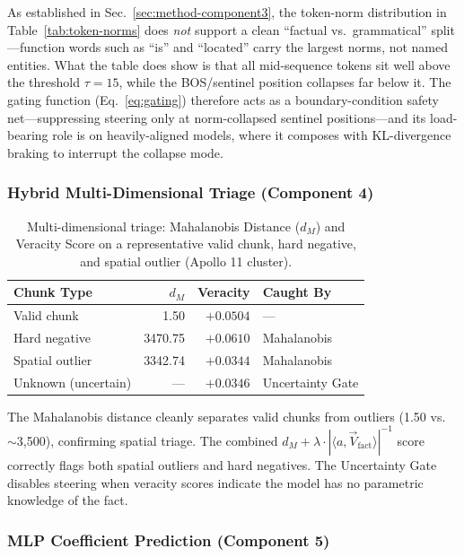 \documentclass[conference]{IEEEtran}
\begin{document}
As established in Sec.~\ref{sec:method-component3}, the token-norm distribution in Table~\ref{tab:token-norms} does \emph{not} support a clean ``factual vs.\ grammatical'' split---function words such as ``is'' and ``located'' carry the largest norms, not named entities. What the table does show is that all mid-sequence tokens sit well above the threshold $\tau\!=\!15$, while the BOS/sentinel position collapses far below it. The gating function (Eq.~\ref{eq:gating}) therefore acts as a boundary-condition safety net---suppressing steering only at norm-collapsed sentinel positions---and its load-bearing role is on heavily-aligned models, where it composes with KL-divergence braking to interrupt the collapse mode.

\subsubsection{Hybrid Multi-Dimensional Triage (Component 4)}

\begin{table}[htbp]
\caption{Multi-dimensional triage: Mahalanobis Distance ($d_M$) and Veracity Score on a representative valid chunk, hard negative, and spatial outlier (Apollo 11 cluster).}
\centering
\begin{tabular}{lrrl}
\toprule
\textbf{Chunk Type} & \textbf{$d_M$} & \textbf{Veracity} & \textbf{Caught By} \\
\midrule
Valid chunk         & 1.50    & $+0.0504$ & --- \\
Hard negative       & 3470.75 & $+0.0610$ & Mahalanobis \\
Spatial outlier     & 3342.74 & $+0.0344$ & Mahalanobis \\
Unknown (uncertain) & ---     & $+0.0346$ & Uncertainty Gate \\
\bottomrule
\end{tabular}
\label{tab:triage}
\end{table}

The Mahalanobis distance cleanly separates valid chunks from outliers (1.50 vs.\ $\sim$3{,}500), confirming spatial triage. The combined $d_M + \lambda \cdot |\langle a, \vec{V}_{\text{fact}}\rangle|^{-1}$ score correctly flags both spatial outliers and hard negatives. The Uncertainty Gate disables steering when veracity scores indicate the model has no parametric knowledge of the fact.

\subsubsection{MLP Coefficient Prediction (Component 5)}
\end{document}
